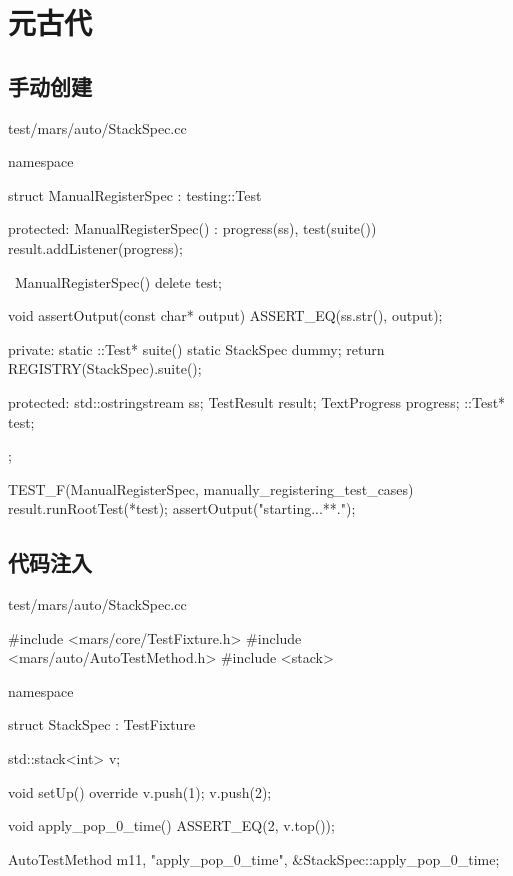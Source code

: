 \section{元古代}

\begin{content}

\subsection{手动创建}

\begin{nodiff}{test/mars/auto/StackSpec.cc}
 \begin{c++}
namespace {
  struct ManualRegisterSpec : testing::Test {
  protected:
    ManualRegisterSpec() : progress(ss), test(suite()) {
      result.addListener(progress);
    }

    ~ManualRegisterSpec() {
      delete test;
    }

    void assertOutput(const char* output) {
      ASSERT_EQ(ss.str(), output);
    }

  private:
    static ::Test* suite() {
      static StackSpec dummy;
      return REGISTRY(StackSpec).suite();
    }

  protected:
    std::ostringstream ss;
    TestResult result;
    TextProgress progress;
    ::Test* test;
  };
}

TEST_F(ManualRegisterSpec, manually_registering_test_cases) {
  result.runRootTest(*test);
  assertOutput("starting...\n***\nend.\n");
}
 \end{c++}
\end{nodiff}

\subsection{代码注入}

\begin{nodiff}{test/mars/auto/StackSpec.cc}
 \begin{c++}
#include <mars/core/TestFixture.h>
#include <mars/auto/AutoTestMethod.h>
#include <stack>

namespace {
  struct StackSpec : TestFixture {
    std::stack<int> v;

    void setUp() override {
      v.push(1);
      v.push(2);
    }

    void apply_pop_0_time() {
      ASSERT_EQ(2, v.top());
    }

    AutoTestMethod m1{1, "apply_pop_0_time", &StackSpec::apply_pop_0_time};

}}
\end{c++}
\end{nodiff}
\end{content}
